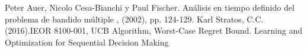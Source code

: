 \documentclass{article}
\begin{document}
\begin{thebibliography}{99}

 Peter Auer, Nicolo Cesa-Bianchi y Paul Fischer. Análisis en tiempo definido del problema de bandido múltiple , (2002), pp. 124-129.
 Karl Stratos, C.C. (2016).IEOR 8100-001, UCB Algorithm, Worst-Case Regret Bound. Learning and Optimization for Sequential Decision Making 
\end{thebibliography}
\end{document}
